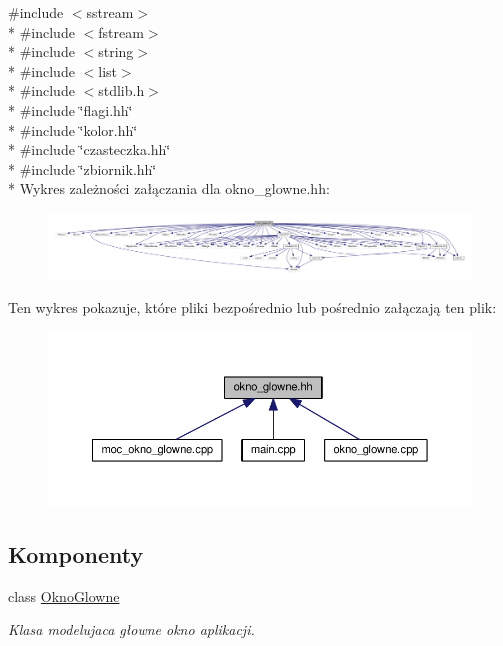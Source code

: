 {\ttfamily \#include $<$sstream$>$}\\*
{\ttfamily \#include $<$fstream$>$}\\*
{\ttfamily \#include $<$string$>$}\\*
{\ttfamily \#include $<$list$>$}\\*
{\ttfamily \#include $<$stdlib.\-h$>$}\\*
{\ttfamily \#include \char`\"{}flagi.\-hh\char`\"{}}\\*
{\ttfamily \#include \char`\"{}kolor.\-hh\char`\"{}}\\*
{\ttfamily \#include \char`\"{}czasteczka.\-hh\char`\"{}}\\*
{\ttfamily \#include \char`\"{}zbiornik.\-hh\char`\"{}}\\*
Wykres zależności załączania dla okno\-\_\-glowne.\-hh\-:\nopagebreak
\begin{figure}[H]
\begin{center}
\leavevmode
\includegraphics[width=350pt]{okno__glowne_8hh__incl}
\end{center}
\end{figure}
Ten wykres pokazuje, które pliki bezpośrednio lub pośrednio załączają ten plik\-:
\nopagebreak
\begin{figure}[H]
\begin{center}
\leavevmode
\includegraphics[width=350pt]{okno__glowne_8hh__dep__incl}
\end{center}
\end{figure}
\subsection*{Komponenty}
\begin{DoxyCompactItemize}
\item 
class \hyperlink{class_okno_glowne}{Okno\-Glowne}
\begin{DoxyCompactList}\small\item\em Klasa modelujaca głowne okno aplikacji. \end{DoxyCompactList}\end{DoxyCompactItemize}


